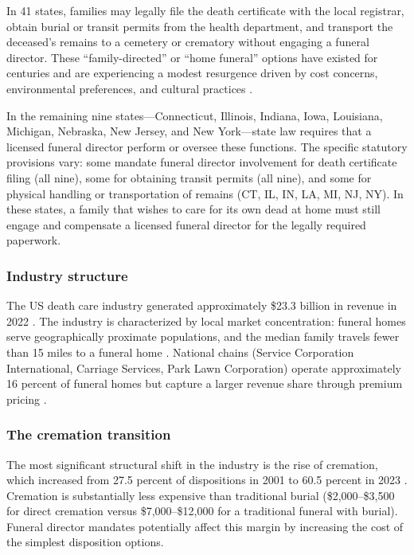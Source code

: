 \documentclass[12pt]{article}
\begin{document}
In 41 states, families may legally file the death certificate with the local registrar, obtain burial or transit permits from the health department, and transport the deceased's remains to a cemetery or crematory without engaging a funeral director. These ``family-directed'' or ``home funeral'' options have existed for centuries and are experiencing a modest resurgence driven by cost concerns, environmental preferences, and cultural practices \citep{harris2007grave, webster2020reimagining}.

In the remaining nine states---Connecticut, Illinois, Indiana, Iowa, Louisiana, Michigan, Nebraska, New Jersey, and New York---state law requires that a licensed funeral director perform or oversee these functions. The specific statutory provisions vary: some mandate funeral director involvement for death certificate filing (all nine), some for obtaining transit permits (all nine), and some for physical handling or transportation of remains (CT, IL, IN, LA, MI, NJ, NY). In these states, a family that wishes to care for its own dead at home must still engage and compensate a licensed funeral director for the legally required paperwork.

\subsubsection*{Industry structure} The US death care industry generated approximately \$23.3 billion in revenue in 2022 \citep{ibisworld2023}. The industry is characterized by local market concentration: funeral homes serve geographically proximate populations, and the median family travels fewer than 15 miles to a funeral home \citep{nfda2023statistics}. National chains (Service Corporation International, Carriage Services, Park Lawn Corporation) operate approximately 16 percent of funeral homes but capture a larger revenue share through premium pricing \citep{cremation2022statistics}.

\subsubsection*{The cremation transition} The most significant structural shift in the industry is the rise of cremation, which increased from 27.5 percent of dispositions in 2001 to 60.5 percent in 2023 \citep{cremation2022statistics}. Cremation is substantially less expensive than traditional burial (\$2,000--\$3,500 for direct cremation versus \$7,000--\$12,000 for a traditional funeral with burial). Funeral director mandates potentially affect this margin by increasing the cost of the simplest disposition options.
\end{document}
